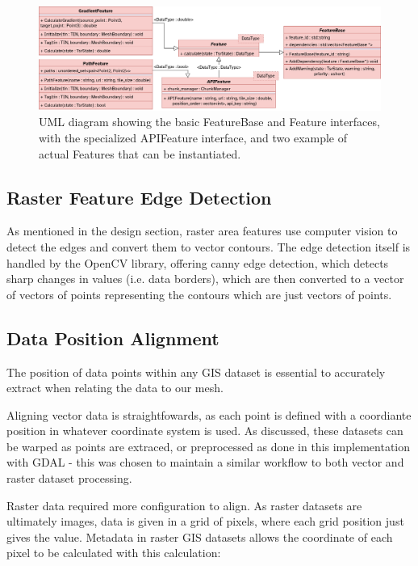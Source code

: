 \documentclass[12pt]{article}
\begin{document}
\begin{figure}[!htbp]
  \centering
  \includegraphics[width=\textwidth]{assets/FeatureBase.png}
  \caption{UML diagram showing the basic FeatureBase and Feature interfaces, with the specialized APIFeature interface, and two example of actual Features that can be instantiated.}\label{impl:features:uml}
\end{figure}


\subsection{Raster Feature Edge Detection}

As mentioned in the design section, raster area features use computer vision to detect the edges and convert them to vector contours. The edge detection itself is handled by the OpenCV library, offering canny edge detection, which detects sharp changes in values (i.e. data borders), which are then converted to a vector of vectors of points representing the contours which are just vectors of points.

\subsection{Data Position Alignment}

The position of data points within any GIS dataset is essential to accurately extract when relating the data to our mesh.

Aligning vector data is straightfowards, as each point is defined with a coordiante position in whatever coordinate system is used. As discussed, these datasets can be warped as points are extraced, or preprocessed as done in this implementation with GDAL - this was chosen to maintain a similar workflow to both vector and raster dataset processing.

Raster data required more configuration to align. As raster datasets are ultimately images, data is given in a grid of pixels, where each grid position just gives the value. Metadata in raster GIS datasets allows the coordinate of each pixel to be calculated with this calculation:
\end{document}

